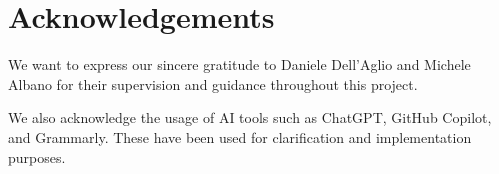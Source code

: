 

\section{Acknowledgements}\label{sec:acknowledgements}
We want to express our sincere gratitude to Daniele Dell'Aglio and Michele Albano for their supervision and guidance throughout this project.

We also acknowledge the usage of AI tools such as ChatGPT, GitHub Copilot, and Grammarly.
These have been used for clarification and implementation purposes.